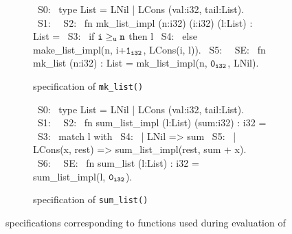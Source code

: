 \begin{figure}[H]
\begin{subfigure}[b]{\textwidth}
\begin{center}
\begin{allLangEnvFoot}
~{\tiny \textcolor{mygray}{S0:}}~ type List = LNil | LCons (val:i32, tail:List).
~{\tiny \textcolor{mygray}{S1:}}~ 
~{\tiny \textcolor{mygray}{S2:}}~ fn mk_list_impl (n:i32) (i:i32) (l:List) : List =
~{\tiny \textcolor{mygray}{S3:}}~     if ${\tt i \geq_u n}$ then l
~{\tiny \textcolor{mygray}{S4:}}~             else make_list_impl(n, i+${\tt 1_{i32}}$, LCons(i, l)).
~{\tiny \textcolor{mygray}{S5:}}~ 
~{\tiny \textcolor{mygray}{SE:}}~ fn mk_list (n:i32) : List = mk_list_impl(n, ${\tt 0_{i32}}$, LNil).
\end{allLangEnvFoot}
\end{center}
\caption{\SpecL{} specification of {\tt mk\_list()}}
\end{subfigure}
\begin{subfigure}[b]{\textwidth}
\begin{center}
\begin{allLangEnvFoot}
~{\tiny \textcolor{mygray}{S0:}}~ type List = LNil | LCons (val:i32, tail:List).
~{\tiny \textcolor{mygray}{S1:}}~ 
~{\tiny \textcolor{mygray}{S2:}}~ fn sum_list_impl (l:List) (sum:i32) : i32 =
~{\tiny \textcolor{mygray}{S3:}}~    match l with
~{\tiny \textcolor{mygray}{S4:}}~    | LNil => sum
~{\tiny \textcolor{mygray}{S5:}}~    | LCons(x, rest) => sum_list_impl(rest, sum + x).
~{\tiny \textcolor{mygray}{S6:}}~ 
~{\tiny \textcolor{mygray}{SE:}}~ fn sum_list (l:List) : i32 = sum_list_impl(l, ${\tt 0_{i32}}$).
\end{allLangEnvFoot}
\end{center}
\caption{\SpecL{} specification of {\tt sum\_list()}}
\end{subfigure}
\caption{\label{fig:specifications}\SpecL{} specifications corresponding to functions used during evaluation of \toolName{}}
\end{figure}
